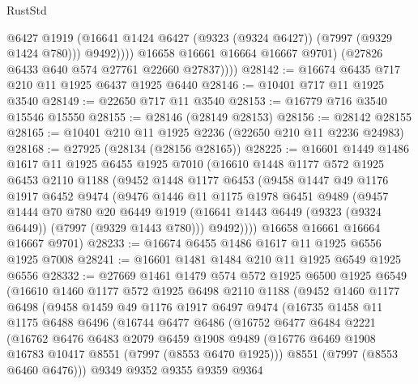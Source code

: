 \begin{lexlean}{RustStd}
\begin{coremodule}
{\begin{coremodule}
{{{{{{{{{{{{{{{{{{{{{{{{{{{{{{{{{{{{{{{{{{{                    @6427
                    @1919
                    (@16641 @1424 @6427 (@9323 (@9324 @6427)) (@7997 (@9329 @1424 @780)))
                    @9492))))
            @16658
            @16661
            @16664
            @16667
            @9701)
          (@27826 @6433 @640 @574 @27761 @22660 @27837))))
@28142 := @16674 @6435 @717 @210 @11 @1925 @6437 @1925 @6440
@28146 := @10401 @717 @11 @1925 @3540
@28149 := @22650 @717 @11 @3540
@28153 := @16779 @716 @3540 @15546 @15550
@28155 := @28146 (@28149 @28153)
@28156 := @28142 @28155
@28165 := @10401 @210 @11 @1925 @2236 (@22650 @210 @11 @2236 @24983)
@28168 := @27925 (@28134 (@28156 @28165))
@28225 := @16601
    @1449
    @1486
    @1617
    @11
    @1925
    @6455
    @1925
    @7010
    (@16610
      @1448
      @1177
      @572
      @1925
      @6453
      @2110
      @1188
      (@9452
        @1448
        @1177
        @6453
        (@9458
          @1447
          @49
          @1176
          @1917
          @6452
          @9474
          (@9476
            @1446
            @11
            @1175
            @1978
            @6451
            @9489
            (@9457
              @1444
              @70
              @780
              @20
              @6449
              @1919
              (@16641 @1443 @6449 (@9323 (@9324 @6449)) (@7997 (@9329 @1443 @780)))
              @9492))))
      @16658
      @16661
      @16664
      @16667
      @9701)
@28233 := @16674 @6455 @1486 @1617 @11 @1925 @6556 @1925 @7008
@28241 := @16601 @1481 @1484 @210 @11 @1925 @6549 @1925 @6556
@28332 := @27669
    @1461
    @1479
    @574
    @572
    @1925
    @6500
    @1925
    @6549
    (@16610
      @1460
      @1177
      @572
      @1925
      @6498
      @2110
      @1188
      (@9452
        @1460
        @1177
        @6498
        (@9458
          @1459
          @49
          @1176
          @1917
          @6497
          @9474
          (@16735
            @1458
            @11
            @1175
            @6488
            @6496
            (@16744
              @6477
              @6486
              (@16752
                @6477
                @6484
                @2221
                (@16762
                  @6476
                  @6483
                  @2079
                  @6459
                  @1908
                  @9489
                  (@16776 @6469 @1908 @16783 @10417 @8551 (@7997 (@8553 @6470 @1925)))
                  @8551
                  (@7997 (@8553 @6460 @6476)))
                @9349
                @9352
                @9355
                @9359
                @9364
}}}}}}}}}}}}}}}}}}}}}}}}}}}}}}}}}}}}}}}}}}}
\end{coremodule}}
\end{coremodule}
\end{lexlean}
